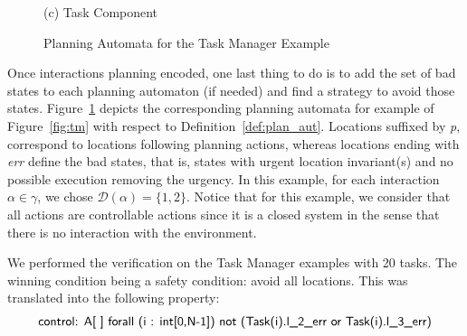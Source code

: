 \begin{figure}[ht]
\begin{minipage}[b]{\linewidth}
    (c) Task Component 
  \vspace{4ex}
  \end{minipage}%
  \caption{Planning Automata for the Task Manager Example}
  \label{fig:uppaal} 
\end{figure}

Once interactions planning encoded, one last thing to do is to add the set of bad states to each
planning automaton (if needed) and find a strategy to avoid those states. 
Figure~\ref{fig:uppaal} depicts the corresponding planning automata for example of 
Figure~\ref{fig:tm} with respect to Definition~\ref{def:plan_aut}. 
Locations suffixed by \emph{p}, correspond to locations following 
planning actions, whereas locations ending with \emph{err} define the bad states, that is,
states with urgent location invariant(s) and no possible execution removing the urgency. 
In this example, for each interaction $\alpha\in\gamma$, we chose $\mathcal{D}(\alpha)=\{1,2\}$.
Notice that for this example, we consider that all actions are controllable actions since
it is a closed system in the sense that there is no interaction with the environment.

We performed the verification on the Task Manager examples with 20 tasks. The winning 
condition being a safety condition: avoid all \emph{} locations. This was translated 
into the following property:
\begin{equation}\label{eq:avoid}
  \text{\textsf{control: A[ ] forall (i : int[0,N-1]) not (Task(i).l\_{2\_{err}} or 
  Task(i).l\_{3\_{err}})}}
\end{equation}

